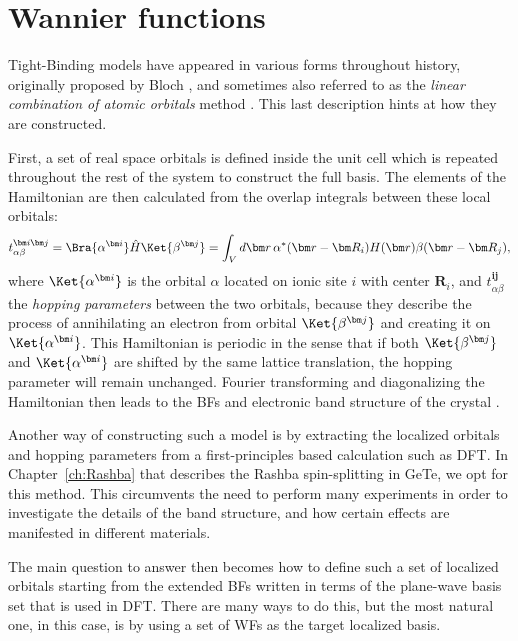 \chapter{Wannier functions \label{ch:Wannier}}
Tight-Binding models have appeared in various forms throughout history, originally proposed by Bloch \cite{Bloch1929}, and sometimes also referred to as the {\it linear combination of atomic orbitals} method \cite{Slater1954}.
This last description hints at how they are constructed.

First, a set of real space orbitals is defined inside the unit cell which is repeated throughout the rest of the system to construct the full basis.
The elements of the Hamiltonian are then calculated from the overlap integrals between these local orbitals:
\begin{equation}
	t^{\bm i \bm j}_{\alpha \beta} = \Bra{\alpha^{\bm i}} \hat{H} \Ket{\beta^{\bm j}} = \int_{V} d\bm r\, \alpha^*(\bm r - \bm R_i) H(\bm r) \beta(\bm r - \bm R_j),
\end{equation}
where $\Ket{\alpha^{\bm i}}$ is the orbital $\alpha$ located on ionic site $i$ with center $\bm R_i$, and $t^{\bm i \bm j}_{\alpha \beta}$ the {\it hopping parameters} between the two orbitals, because they describe the process of annihilating an electron from orbital $\Ket{\beta^{\bm j}}$ and creating it on $\Ket{\alpha^{\bm i}}$.
This Hamiltonian is periodic in the sense that if both $\Ket{\beta^{\bm j}}$ and $\Ket{\alpha^{\bm i}}$ are shifted by the same lattice translation, the hopping parameter will remain unchanged.
Fourier transforming and diagonalizing the Hamiltonian then leads to the \glspl{BF} and electronic band structure of the crystal \cite{Ashcroft}.

Another way of constructing such a model is by extracting the localized orbitals and hopping parameters from a first-principles based calculation such as \gls{DFT}. In Chapter~\ref{ch:Rashba} that describes the Rashba spin-splitting in GeTe, we opt for this method.
This circumvents the need to perform many experiments in order to investigate the details of the band structure, and how certain effects are manifested in different materials. 

The main question to answer then becomes how to define such a set of localized orbitals starting from the extended \glspl{BF} written in terms of the plane-wave basis set that is used in \gls{DFT}.
There are many ways to do this, but the most natural one, in this case, is by using a set of \glspl{WF} \cite{Wannier1937} as the target localized basis.

